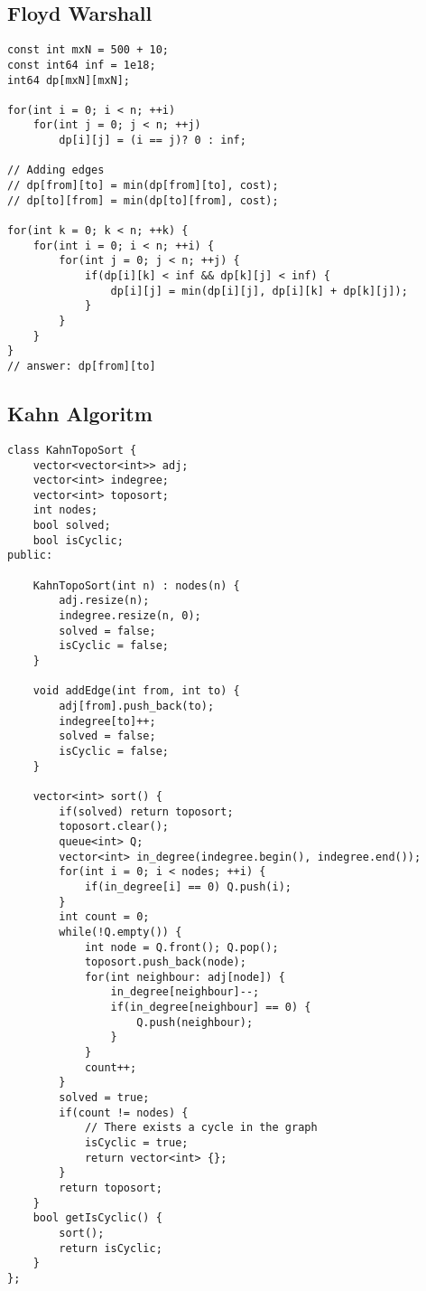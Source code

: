 \documentclass[10pt,letterpaper,twocolumn,twosided]{article}
\begin{document}
\subsection{Floyd Warshall}
\begin{lstlisting}
const int mxN = 500 + 10;
const int64 inf = 1e18;
int64 dp[mxN][mxN];

for(int i = 0; i < n; ++i)
    for(int j = 0; j < n; ++j)
        dp[i][j] = (i == j)? 0 : inf;

// Adding edges
// dp[from][to] = min(dp[from][to], cost);
// dp[to][from] = min(dp[to][from], cost);

for(int k = 0; k < n; ++k) {
    for(int i = 0; i < n; ++i) {
        for(int j = 0; j < n; ++j) {
            if(dp[i][k] < inf && dp[k][j] < inf) {
                dp[i][j] = min(dp[i][j], dp[i][k] + dp[k][j]);
            }
        }
    }
}
// answer: dp[from][to]
\end{lstlisting}

\subsection{Kahn Algoritm}
\begin{lstlisting}
class KahnTopoSort {
    vector<vector<int>> adj;
    vector<int> indegree;
    vector<int> toposort;
    int nodes;
    bool solved;
    bool isCyclic;
public:
    
    KahnTopoSort(int n) : nodes(n) {
        adj.resize(n);
        indegree.resize(n, 0);
        solved = false;
        isCyclic = false;
    }
    
    void addEdge(int from, int to) {
        adj[from].push_back(to);
        indegree[to]++;
        solved = false;
        isCyclic = false;
    }
    
    vector<int> sort() {
        if(solved) return toposort;
        toposort.clear();
        queue<int> Q;
        vector<int> in_degree(indegree.begin(), indegree.end());
        for(int i = 0; i < nodes; ++i) {
            if(in_degree[i] == 0) Q.push(i);
        }
        int count = 0;
        while(!Q.empty()) {
            int node = Q.front(); Q.pop();
            toposort.push_back(node);
            for(int neighbour: adj[node]) {
                in_degree[neighbour]--;
                if(in_degree[neighbour] == 0) {
                    Q.push(neighbour);
                }
            }
            count++;
        }
        solved = true;
        if(count != nodes) {
            // There exists a cycle in the graph
            isCyclic = true;
            return vector<int> {};
        }
        return toposort;
    }
    bool getIsCyclic() {
        sort();
        return isCyclic;
    }
};
\end{lstlisting}
\end{document}
